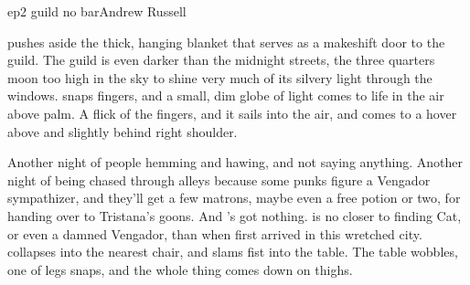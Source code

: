 \documentclass{book}
\begin{document}
\begin{childnode}{ep2 guild no bar}{Andrew Russell}


    \name{} pushes aside the thick, hanging blanket that serves as a makeshift door to the guild. The guild is even darker than the midnight streets, the three quarters moon too high in the sky to 
    shine very much of its silvery light 
    through the 
    windows. \name{} snaps \hisher{} fingers, and a small, dim globe of light comes to life in the air above \hisher{} palm. A flick of the fingers, and it sails into the air, and comes to a hover above and slightly behind \hisher{} right shoulder.

    Another night of people hemming and hawing, and not saying anything. Another night of being chased through alleys because some punks figure \names{} a Vengador sympathizer, and
    they'll get a few matrons, maybe even a free potion or two, for handing \himher{} over to Tristana's goons. 
    And \heshe{}'s got nothing. \HeShe{} is no closer to finding Cat, or even a damned Vengador, than when \heshe{} first arrived in this wretched city.
    \name{} collapses into the nearest chair, and slams \hisher{} fist into the table. The table wobbles, one of legs snaps, and the whole thing comes down on \hisher{} thighs.



\end{childnode}
\end{document}
